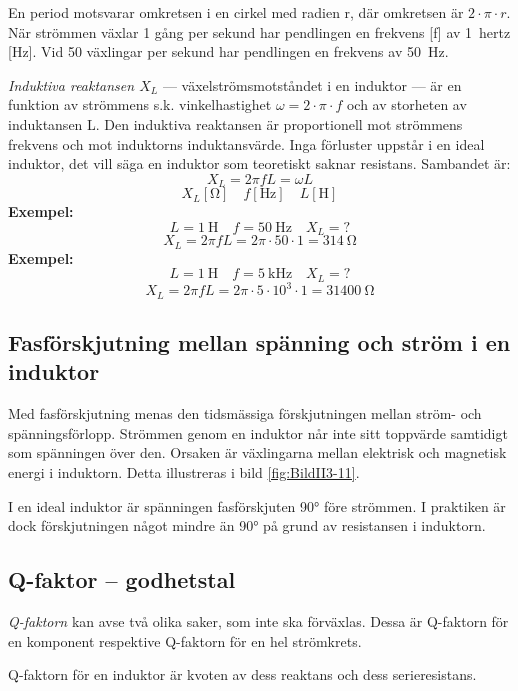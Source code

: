 En period motsvarar omkretsen i en cirkel med radien r, där omkretsen är \(2
\cdot \pi \cdot r\). När strömmen växlar 1 gång per sekund har pendlingen en
frekvens [f] av 1~hertz [Hz]. Vid 50 växlingar per sekund har pendlingen en
frekvens av 50~Hz.

\emph{Induktiva reaktansen \(X_L\)} --- växelströmsmotståndet i en induktor ---
är en funktion av strömmens s.k. vinkelhastighet \(\omega = 2 \cdot \pi \cdot
f\) och av storheten av induktansen L.
Den induktiva reaktansen är proportionell mot strömmens frekvens och mot
induktorns induktansvärde. Inga förluster uppstår i en ideal induktor, det vill säga 
en induktor som teoretiskt saknar resistans.
Sambandet är:
\[X_L = 2\pi fL = \omega L\]
\[X_L [\si{\ohm}] \quad f [\si{\hertz}] \quad L [\si{\henry}]\]
\textbf{Exempel:}
\[L = \SI{1}{\henry} \quad f = \SI{50}{\hertz} \quad X_L = ?\]
\[X_L = 2\pi fL = 2\pi \cdot 50 \cdot 1 = \SI{314}{\ohm}\]
\textbf{Exempel:}
\[L = \SI{1}{\henry} \quad f = \SI{5}{\kilo\hertz} \quad X_L = ?\]
\[X_L = 2\pi fL = 2\pi  \cdot 5 \cdot 10^3 \cdot 1 = \SI{31400}{\ohm}\]

\subsection{Fasförskjutning mellan spänning och ström i en induktor}

Med fasförskjutning menas den tidsmässiga förskjutningen mellan ström- och
spänningsförlopp. Strömmen genom en induktor når inte sitt toppvärde samtidigt
som spänningen över den. Orsaken är växlingarna mellan elektrisk och magnetisk
energi i induktorn. Detta illustreras i bild \ref{fig:BildII3-11}.

I en ideal induktor är spänningen fasförskjuten \ang{90} före strömmen.
I praktiken är dock förskjutningen något mindre än \ang{90} på grund av
resistansen i induktorn.

\subsection{Q-faktor -- godhetstal}

\emph{Q-faktorn} kan avse två olika saker, som inte ska förväxlas.
Dessa är Q-faktorn för en komponent respektive Q-faktorn för en hel strömkrets.

Q-faktorn för en induktor är kvoten av dess reaktans och dess serieresistans.


